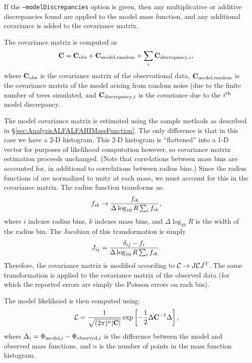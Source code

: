 If the {\tt --modelDiscrepancies} option is given, then any multiplicative or additive discrepancies found are applied to the model mass function, and any additional covariance is added to the covariance matrix.

The covariance matrix is computed as
\begin{equation}
 {\bf C} = {\bf C}_{\rm obs} + {\bf C}_{\rm model,random} + \sum_i {\bf C}_{{\rm discrepancy}, i},
\end{equation}
where ${\bf C}_{\rm obs}$ is the covariance matrix of the observational data, ${\bf C}_{\rm model,random}$ is the covariance matrix of the model arising from random noise (due to the finite number of trees simulated, and ${\bf C}_{{\rm discrepancy}, i}$ is the covariance due to the $i^{\rm th}$ model discrepancy.

The model covariance matrix is estimated using the sample methods as described in \S\ref{sec:AnalysisALFALFAHIMassFunction}. The only difference is that in this case we have a 2-D histogram. This 2-D histogram is ``flattened'' into a 1-D vector for purposes of likelihood computation however, so covariance matrix estimation proceeds unchanged. (Note that correlations between mass bins are accounted for, in additional to correlations between radius bins.) Since the radius functions of \cite{shen_size_2003} are normalized to unity at each mass, we must account for this in the covariance matrix. The radius function transforms as:
\begin{equation}
 f_{ik} \rightarrow {f_{ik} \over \Delta \log_{10} R \sum_i f_{ik} },
\end{equation}
where $i$ indexes radius bins, $k$ indexes mass bins, and $\Delta \log_{10} R$ is the width of the radius bin. The Jacobian of this transformation is simply
\begin{equation}
 J_{ij} = {\delta_{ij} - f_i \over  \Delta \log_{10} R \sum_i f_{ik}}.
\end{equation}
Therefore, the covariance matrix is modified according to $\mathcal{C} \rightarrow J \mathcal{C} J^{\rm T}$. The same transformation is applied to the covariance matrix of the observed data (for which the reported errors are simply the Poisson errors on each bin).

The model likelihood is then computed using:
\begin{equation}
 \mathcal{L} = {1 \over \sqrt{(2 \pi)^n |{\bf C}|}} \exp\left[ -{1\over 2} \Delta {\bf C}^{-1} \Delta \right],
\end{equation}
where $\Delta_i = \Phi_{{\rm model}, i} - \Phi_{{\rm observed}, i}$ is the difference between the model and observed mass functions, and $n$ is the number of points in the mass function histogram.

